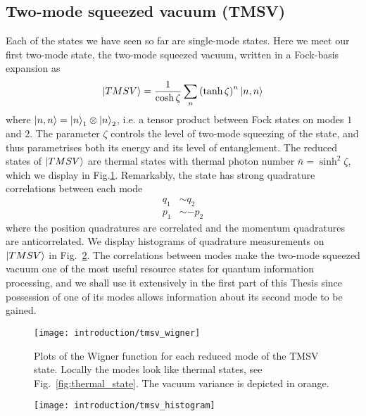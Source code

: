 \subsection{Two-mode squeezed vacuum (TMSV)}
Each of the states we have seen so far are single-mode states. Here we meet our first two-mode state, the two-mode squeezed vacuum, written in a Fock-basis expansion as
\begin{equation}
\ket{TMSV} = \frac{1}{\cosh \zeta} \sum_n \left( \tanh \zeta \right)^n \ket{n, n}
\end{equation}
where $\ket{n, n} = \ket{n}_1 \otimes \ket{n}_2$, i.e. a tensor product between Fock states on modes $1$ and $2$. The parameter $\zeta$ controls the level of two-mode squeezing of the state, and thus parametrises both its energy and its level of entanglement. The reduced states of $\ket{TMSV}$ are thermal states with thermal photon number $\bar{n} = \sinh^2 \zeta$, which we display in Fig.\ref{fig:tmsv_wigner}. Remarkably, the state has strong quadrature correlations between each mode
\begin{align*}
q_1 &\sim q_2 \\
p_1 &\sim - p_2
\end{align*}
where the position quadratures are correlated and the momentum quadratures are anticorrelated. We display histograms of quadrature measurements on $\ket{TMSV}$ in Fig.~\ref{fig:tmsv_histogram}. The correlations between modes make the two-mode squeezed vacuum one of the most useful resource states for quantum information processing, and we shall use it extensively in the first part of this Thesis since possession of one of its modes allows information about its second mode to be gained.


\begin{figure}[htp]
\captionsetup{width=0.8\linewidth}
\centering
\texttt{[image: introduction/tmsv\_wigner]}
\caption{\label{fig:tmsv_wigner} Plots of the Wigner function for each reduced mode of the TMSV state. Locally the modes look like thermal states, see Fig.~\ref{fig:thermal_state}. The vacuum variance is depicted in orange.}
\end{figure}

\begin{figure}[htp]
\captionsetup{width=0.8\linewidth}
\centering
\texttt{[image: introduction/tmsv\_histogram]}
\caption{\label{fig:tmsv_histogram} }
\end{figure}


